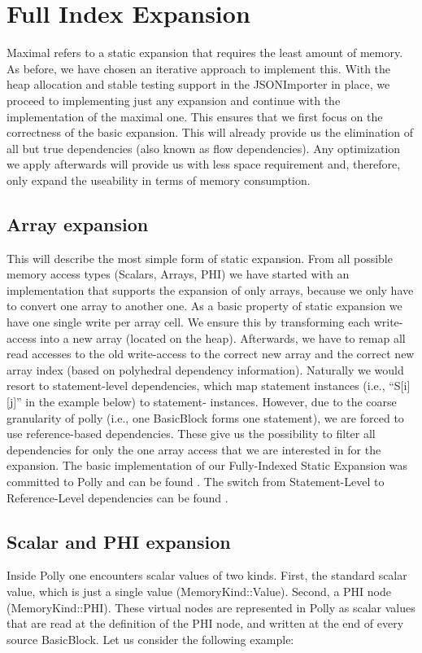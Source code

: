 \chapter{Full Index Expansion}\label{ch:FIE}
Maximal refers to a static expansion that requires the least amount of memory. As before, we have chosen an iterative approach to implement this. With the heap allocation and stable testing support in the JSONImporter in place, we proceed to implementing just any expansion and continue with the implementation of the maximal one. This ensures that we first focus on the correctness of the basic expansion. This will already provide us the elimination of all but true dependencies (also known as flow dependencies). Any optimization we apply afterwards will provide us with less space requirement and, therefore, only expand the useability in terms of memory consumption.

\section{Array expansion}
This will describe the most simple form of static expansion. From all possible memory access types (Scalars, Arrays, PHI) we have started with an implementation that supports the expansion of only arrays, because we only have to convert one array to another one. As a basic property of static expansion we have one single write per array cell. We ensure this by transforming each write-access into a new array (located on the heap). Afterwards, we have to remap all read accesses to the old write-access to the correct new array and the correct new array index (based on polyhedral dependency information). Naturally we would resort to statement-level dependencies, which map statement instances (i.e., “S[i][j]” in the example below) to statement- instances. However, due to the coarse granularity of polly (i.e., one BasicBlock forms one statement), we are forced to use reference-based dependencies. These give us the possibility to filter all dependencies for only the one array access that we are interested in for the expansion. The basic implementation of our Fully-Indexed Static Expansion was committed to Polly and can be found . The switch from Statement-Level to Reference-Level dependencies can be found .

\section{Scalar and PHI expansion}
Inside Polly one encounters scalar values of two kinds. First, the standard scalar value, which is just a single value (MemoryKind::Value). Second, a PHI node (MemoryKind::PHI). These virtual nodes are represented in Polly as scalar values that are read at the definition of the PHI node, and written at the end of every source BasicBlock. Let us consider the following example:

